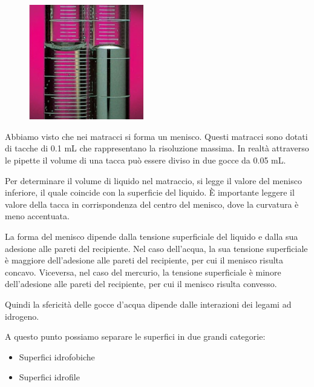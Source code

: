 \hspace{0.5cm}\begin{minipage}{0.395 \textwidth}
   \begin{figure}[H]
       \includegraphics[width=5cm]{immagini/menischi.png}
   \end{figure}
\end{minipage}
\begin{minipage}{0.6 \textwidth}
   \vspace{0.6cm}Abbiamo visto che nei matracci si forma un menisco.
   Questi matracci sono dotati di tacche di 0.1 mL che rappresentano la risoluzione massima. In realtà attraverso le pipette il volume di una tacca può essere diviso in due gocce da 0.05 mL.

   Per determinare il volume di liquido nel matraccio, si legge il valore del menisco inferiore, il quale coincide con la superficie del liquido. È importante leggere il valore della tacca in corrispondenza del centro del menisco, dove la curvatura è meno accentuata.
\end{minipage}

\vspace{0.2cm}La forma del menisco dipende dalla tensione superficiale del liquido e dalla sua adesione alle pareti del recipiente. Nel caso dell'acqua, la sua tensione superficiale è maggiore dell'adesione alle pareti del recipiente, per cui il menisco risulta concavo. Viceversa, nel caso del mercurio, la tensione superficiale è minore dell'adesione alle pareti del recipiente, per cui il menisco risulta convesso.

Quindi la sfericità delle gocce d'acqua dipende dalle interazioni dei legami ad idrogeno.

A questo punto possiamo separare le superfici in due grandi categorie:
\vspace{-0.1cm}
\begin{itemize}
   \item Superfici idrofobiche
   \vspace{-0.1cm}
   \item Superfici idrofile
\end{itemize}

